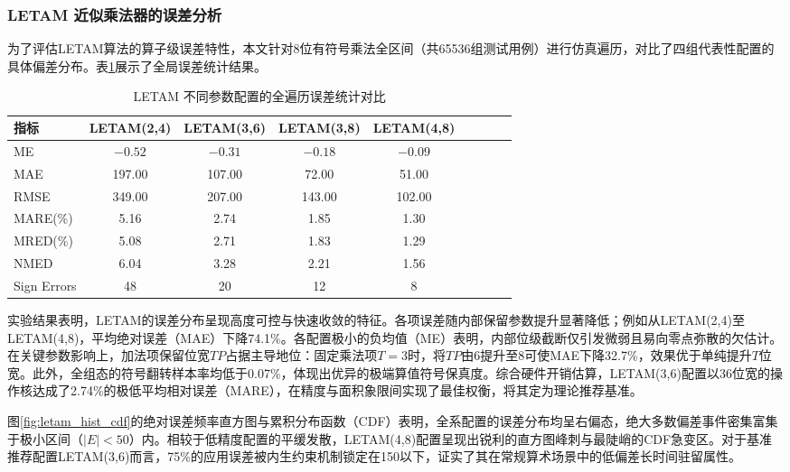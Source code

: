 \documentclass[12pt,a4paper,UTF8]{article}
\begin{document}
\clearpage
\subsubsection{LETAM 近似乘法器的误差分析}

为了评估LETAM算法的算子级误差特性，本文针对8位有符号乘法全区间（共65536组测试用例）进行仿真遍历，对比了四组代表性配置的具体偏差分布。表\ref{tab:letam_error}展示了全局误差统计结果。

\begin{table}[htbp]
\centering
\caption{LETAM 不同参数配置的全遍历误差统计对比}
\label{tab:letam_error}
\begin{tabular}{lcccccccc}
\toprule
\textbf{指标} & \textbf{LETAM(2,4)} & \textbf{LETAM(3,6)} & \textbf{LETAM(3,8)} & \textbf{LETAM(4,8)} \\
\midrule
ME            & $-0.52$   & $-0.31$   & $-0.18$   & $-0.09$   \\
MAE           & 197.00    & 107.00    & 72.00     & 51.00     \\
RMSE          & 349.00    & 207.00    & 143.00    & 102.00    \\
MARE(\%)      & 5.16      & 2.74      & 1.85      & 1.30      \\
MRED(\%)      & 5.08      & 2.71      & 1.83      & 1.29      \\
NMED          & 6.04      & 3.28      & 2.21      & 1.56      \\
Sign Errors   & 48        & 20        & 12        & 8         \\
\bottomrule
\end{tabular}
\end{table}

实验结果表明，LETAM的误差分布呈现高度可控与快速收敛的特征。各项误差随内部保留参数提升显著降低；例如从LETAM(2,4)至LETAM(4,8)，平均绝对误差（MAE）下降74.1\%。各配置极小的负均值（ME）表明，内部位级截断仅引发微弱且易向零点弥散的欠估计。在关键参数影响上，加法项保留位宽$TP$占据主导地位：固定乘法项$T=3$时，将$TP$由6提升至8可使MAE下降32.7\%，效果优于单纯提升$T$位宽。此外，全组态的符号翻转样本率均低于0.07\%，体现出优异的极端算值符号保真度。综合硬件开销估算，LETAM(3,6)配置以36位宽的操作核达成了2.74\%的极低平均相对误差（MARE），在精度与面积象限间实现了最佳权衡，将其定为理论推荐基准。

图\ref{fig:letam_hist_cdf}的绝对误差频率直方图与累积分布函数（CDF）表明，全系配置的误差分布均呈右偏态，绝大多数偏差事件密集富集于极小区间（$|E| < 50$）内。相较于低精度配置的平缓发散，LETAM(4,8)配置呈现出锐利的直方图峰刺与最陡峭的CDF急变区。对于基准推荐配置LETAM(3,6)而言，75\%的应用误差被内生约束机制锁定在150以下，证实了其在常规算术场景中的低偏差长时间驻留属性。
\end{document}
